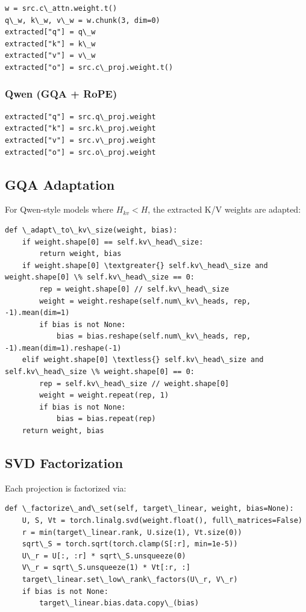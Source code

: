 \begin{lstlisting}
w = src.c\_attn.weight.t()
q\_w, k\_w, v\_w = w.chunk(3, dim=0)
extracted["q"] = q\_w
extracted["k"] = k\_w
extracted["v"] = v\_w
extracted["o"] = src.c\_proj.weight.t()
\end{lstlisting}

\subsubsection{Qwen (GQA + RoPE)}

\begin{lstlisting}
extracted["q"] = src.q\_proj.weight
extracted["k"] = src.k\_proj.weight
extracted["v"] = src.v\_proj.weight
extracted["o"] = src.o\_proj.weight
\end{lstlisting}

\subsection{GQA Adaptation}

For Qwen-style models where $H_{kv} < H$, the extracted K/V weights are 
adapted:

\begin{lstlisting}
def \_adapt\_to\_kv\_size(weight, bias):
    if weight.shape[0] == self.kv\_head\_size:
        return weight, bias
    if weight.shape[0] \textgreater{} self.kv\_head\_size and weight.shape[0] \% self.kv\_head\_size == 0:
        rep = weight.shape[0] // self.kv\_head\_size
        weight = weight.reshape(self.num\_kv\_heads, rep, -1).mean(dim=1)
        if bias is not None:
            bias = bias.reshape(self.num\_kv\_heads, rep, -1).mean(dim=1).reshape(-1)
    elif weight.shape[0] \textless{} self.kv\_head\_size and self.kv\_head\_size \% weight.shape[0] == 0:
        rep = self.kv\_head\_size // weight.shape[0]
        weight = weight.repeat(rep, 1)
        if bias is not None:
            bias = bias.repeat(rep)
    return weight, bias
\end{lstlisting}

\subsection{SVD Factorization}

Each projection is factorized via:

\begin{lstlisting}
def \_factorize\_and\_set(self, target\_linear, weight, bias=None):
    U, S, Vt = torch.linalg.svd(weight.float(), full\_matrices=False)
    r = min(target\_linear.rank, U.size(1), Vt.size(0))
    sqrt\_S = torch.sqrt(torch.clamp(S[:r], min=1e-5))
    U\_r = U[:, :r] * sqrt\_S.unsqueeze(0)
    V\_r = sqrt\_S.unsqueeze(1) * Vt[:r, :]
    target\_linear.set\_low\_rank\_factors(U\_r, V\_r)
    if bias is not None:
        target\_linear.bias.data.copy\_(bias)
\end{lstlisting}

